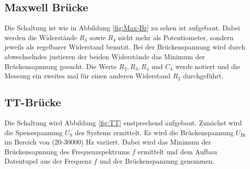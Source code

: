 \subsection{Maxwell Brücke}
Die Schaltung ist wie in Abbildung \ref{fig:Max-Br} zu sehen ist aufgebaut. Dabei werden die Widerstände $R_3$ sowie $R_4$ nicht mehr als Potentiometer, sondern jeweils als regelbarer Widerstand benutzt. Bei der Brückenspannung wird durch abwechselndes justieren der beiden Widerstände das Minimum der Brückensapnnung gesucht. Die Werte $R_2, R_3, R_4$ und $C_4$ werde notiert und die Messung ein zweites mal für einen anderen Widerstand $R_2$ durchgeführt.

\subsection{TT-Brücke}
Die Schaltung wird Abbildung \ref{fig:TT} enstprechend aufgebaut. Zunächst wird die Speisespannung $U_\text{S}$ des Systems ermittelt. Es wird die Brückenspannung $U_\text{Br}$ im Bereich von (20-30000) Hz variiert. Dabei wird das Minimum der Brückensapnnung des Frequenzspektrums $f$ ermittelt und dem Aufbau Datentupel aus der Frequenz $f$ und der Brückenspannung genommen.
